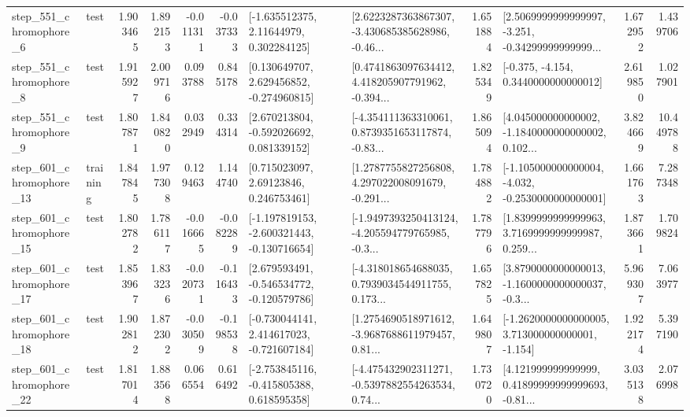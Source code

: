 \begin{tabular}{llrrrrllrlrr}
   step\_551\_chromophore\_6 &      test &      1.903465 &    1.892153 &     -0.011311 & -0.037333 &     [-1.635512375, 2.11644979, 0.302284125] &  [2.6223287363867307, -3.430685385628986, -0.46... &       1.651884 &  [2.5069999999999997, -3.251, -0.34299999999999... &            1.672952 &          1.439706 \\
   step\_551\_chromophore\_8 &      test &      1.915927 &    2.009716 &      0.093788 &  0.845178 &    [0.130649707, 2.629456852, -0.274960815] &  [0.4741863097634412, 4.418205907791962, -0.394... &       1.825349 &               [-0.375, -4.154, 0.3440000000000012] &            2.619850 &          1.027901 \\
   step\_551\_chromophore\_9 &      test &      1.807871 &    1.840820 &      0.032949 &  0.334314 &    [2.670213804, -0.592026692, 0.081339152] &  [-4.354111363310061, 0.8739351653117874, -0.83... &       1.865094 &  [4.045000000000002, -1.1840000000000002, 0.102... &            3.824669 &         10.449788 \\
  step\_601\_chromophore\_13 &  training &      1.847845 &    1.977308 &      0.129463 &  1.144740 &      [0.715023097, 2.69123846, 0.246753461] &  [1.2787755827256808, 4.297022008091679, -0.291... &       1.784882 &  [-1.105000000000004, -4.032, -0.2530000000000001] &            1.661763 &          7.287348 \\
  step\_601\_chromophore\_15 &      test &      1.802782 &    1.786117 &     -0.016665 & -0.082289 &  [-1.197819153, -2.600321443, -0.130716654] &  [-1.9497393250413124, -4.205594779765985, -0.3... &       1.787796 &  [1.8399999999999963, 3.7169999999999987, 0.259... &            1.873661 &          1.709824 \\
  step\_601\_chromophore\_17 &      test &      1.853967 &    1.833236 &     -0.020731 & -0.116433 &   [2.679593491, -0.546534772, -0.120579786] &  [-4.318018654688035, 0.7939034544911755, 0.173... &       1.657825 &  [3.8790000000000013, -1.1600000000000037, -0.3... &            5.969307 &          7.063977 \\
  step\_601\_chromophore\_18 &      test &      1.902812 &    1.872302 &     -0.030509 & -0.198538 &   [-0.730044141, 2.414617023, -0.721607184] &  [1.2754690518971612, -3.9687688611979457, 0.81... &       1.649807 &   [-1.2620000000000005, 3.713000000000001, -1.154] &            1.922174 &          5.397190 \\
  step\_601\_chromophore\_22 &      test &      1.817014 &    1.883568 &      0.066554 &  0.616492 &   [-2.753845116, -0.415805388, 0.618595358] &  [-4.475432902311271, -0.5397882554263534, 0.74... &       1.730720 &  [4.121999999999999, 0.41899999999999693, -0.81... &            3.035138 &          2.076998 \\

\end{tabular}

